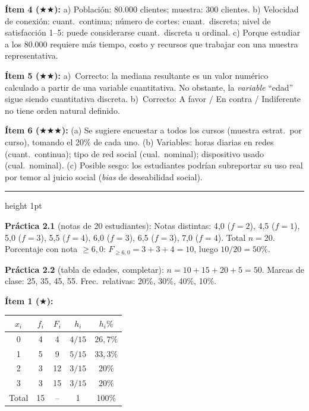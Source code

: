 \documentclass[11pt, letterpaper]{article}
\newcommand{\subbloque}[1]{%
  \vspace{14pt}
  \noindent{\large\bfseries\color{zenitnavy} #1}\par
  \vspace{4pt}\hrule height 1pt\vspace{8pt}}
\begin{document}
\textbf{\'Item 4 ($\bigstar\bigstar$):}
a) Poblaci\'on: 80.000 clientes; muestra: 300 clientes.
b) Velocidad de conexi\'on: cuant.\ continua; n\'umero de cortes: cuant.\ discreta; nivel de satisfacci\'on 1--5: puede considerarse cuant.\ discreta u ordinal.
c) Porque estudiar a los 80.000 requiere m\'as tiempo, costo y recursos que trabajar con una muestra representativa.

\textbf{\'Item 5 ($\bigstar\bigstar$):}
a)~Correcto: la mediana resultante es un valor num\'erico calculado a partir de una variable cuantitativa. No obstante, la \textit{variable} ``edad'' sigue siendo cuantitativa discreta.
b)~Correcto: A favor / En contra / Indiferente no tiene orden natural definido.

\textbf{\'Item 6 ($\bigstar\bigstar\bigstar$):}
(a) Se sugiere encuestar a todos los cursos (muestra estrat.\ por curso), tomando el 20\% de cada uno. (b) Variables: horas diarias en redes (cuant.\ continua); tipo de red social (cual.\ nominal); dispositivo usado (cual.\ nominal). (c) Posible sesgo: los estudiantes podr\'ian subreportar su uso real por temor al juicio social (\textit{bias} de deseabilidad social).

\subbloque{Secci\'on 2 --- Tablas de frecuencia}

\textbf{Pr\'actica 2.1} (notas de 20 estudiantes):
Notas distintas: 4{,}0 ($f=2$), 4{,}5 ($f=1$), 5{,}0 ($f=3$), 5{,}5 ($f=4$), 6{,}0 ($f=3$), 6{,}5 ($f=3$), 7{,}0 ($f=4$). Total $n=20$.
Porcentaje con nota $\geq 6{,}0$: $F_{\geq 6{,}0} = 3+3+4=10$, luego $10/20 = 50\%$.

\textbf{Pr\'actica 2.2} (tabla de edades, completar):
$n=10+15+20+5=50$. Marcas de clase: 25, 35, 45, 55. Frec.\ relativas: 20\%, 30\%, 40\%, 10\%.

\textbf{\'Item 1 ($\bigstar$):}
\begin{center}\small
\begin{tabular}{ccccc}
\toprule $x_i$ & $f_i$ & $F_i$ & $h_i$ & $h_i\%$\\\midrule
0&4&4&$4/15$&$26{,}7\%$\\1&5&9&$5/15$&$33{,}3\%$\\2&3&12&$3/15$&$20\%$\\3&3&15&$3/15$&$20\%$\\\midrule
Total&15&--&1&100\%\\\bottomrule
\end{tabular}
\end{center}
\end{document}
